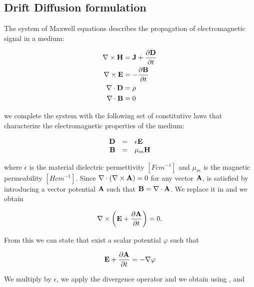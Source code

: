 \subsection{Drift Diffusion formulation}
 The system of Maxwell equations describes the propagation of electromagnetic signal in a medium:

\begin{align}
\nabla \times \mathbf{H} & =  \mathbf{J} + \dfrac{\partial \mathbf{D}}{\partial t} \label{eq: magnetic equation} \\ 
\nabla \times \mathbf{E} & =  - \dfrac{\partial \mathbf{B}}{\partial t} \label{eq: ampere law}\\ 
\nabla \cdot \mathbf{D} & =  \rho \label{eq: gauss law}\\ 
\nabla \cdot \mathbf{B} &  =  0 \label{eq: no magetic charge law}
\end{align}

we complete the system with the following set of constitutive laws that characterize the electromagnetic properties of the medium:

\begin{equation}
\begin{array}{rcl}
\mathbf{D} & = & \epsilon \mathbf{E} \\
\mathbf{B} & = & \mu_m \mathbf{H} \label{eq: magnetic costitutive}
\end{array}
\end{equation}

where $\epsilon$ is the material dielectric permettivity $[F cm^{-1}]$ and $\mu_m$ is the magnetic permeability $[H cm^{-1}]$. Since $\nabla \cdot (\nabla \times \mathbf{A})=0$ for any vector $\mathbf{A}$,  is satisfied by introducing a vector potential $\mathbf{A}$ such that $\mathbf{B}= \nabla \cdot \mathbf{A}$. We replace it in  and we obtain

\begin{equation}
\nabla \times \left( \mathbf{E} + \dfrac{\partial \mathbf{A}}{\partial t} \right) = 0.
\end{equation}

From this we can state that exist a scalar potential $\varphi$ such that

\begin{equation}
\label{eq: potenziale scalare}
\mathbf{E} + \dfrac{\partial \mathbf{A}}{\partial t} = -\nabla \varphi
\end{equation}


We multiply  by $\epsilon$, we apply the divergence operator and we obtain using ,  and 

